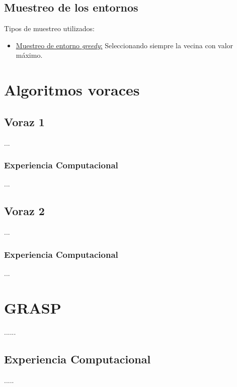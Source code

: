 \documentclass{article}
\begin{document}
\subsection{Muestreo de los entornos}

Tipos de muestreo utilizados:
\begin{itemize}
    \item \underline{Muestreo de entorno \textit{greedy}:} Seleccionando siempre la vecina con valor máximo.
\end{itemize}
\section{Algoritmos voraces}

\subsection{Voraz 1}

...

\subsubsection{Experiencia Computacional}

...
\subsection{Voraz 2}

...

\subsubsection{Experiencia Computacional}

...
\section{GRASP}

......

\subsection{Experiencia Computacional}

.....
\end{document}
